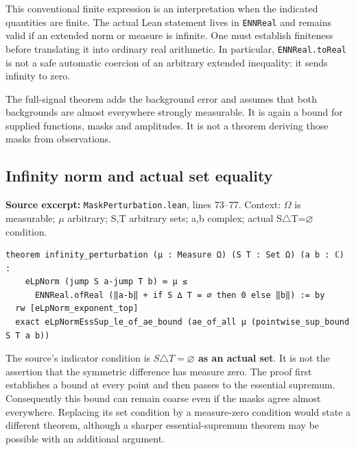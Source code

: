 \documentclass[11pt]{article}
\begin{document}
This conventional finite expression is an interpretation when the indicated quantities are finite. The actual Lean statement lives in \texttt{ENNReal} and remains valid if an extended norm or measure is infinite. One must establish finiteness before translating it into ordinary real arithmetic. In particular, \texttt{ENNReal.toReal} is not a safe automatic coercion of an arbitrary extended inequality: it sends infinity to zero.

The full-signal theorem adds the background error and assumes that both backgrounds are almost everywhere strongly measurable. It is again a bound for supplied functions, masks and amplitudes. It is not a theorem deriving those masks from observations.

\hypertarget{infinity-norm-and-actual-set-equality}{%
\subsection{Infinity norm and actual set equality}\label{infinity-norm-and-actual-set-equality}}

\textbf{Source excerpt:} \texttt{MaskPerturbation.lean}, lines 73--77. Context: \ensuremath{\Omega} is measurable; \ensuremath{\mu} arbitrary; S,T arbitrary sets; a,b complex; actual S\ensuremath{\triangle}T=\ensuremath{\varnothing} condition.

\begin{minipage}{\linewidth}
\begin{lstlisting}
theorem infinity_perturbation (μ : Measure Ω) (S T : Set Ω) (a b : ℂ) :
    eLpNorm (jump S a-jump T b) ∞ μ ≤
      ENNReal.ofReal (‖a-b‖ + if S ∆ T = ∅ then 0 else ‖b‖) := by
  rw [eLpNorm_exponent_top]
  exact eLpNormEssSup_le_of_ae_bound (ae_of_all μ (pointwise_sup_bound S T a b))
\end{lstlisting}
\end{minipage}\par

The source's indicator condition is \textbf{\(S\triangle T=\varnothing\) as an actual set}. It is not the assertion that the symmetric difference has measure zero. The proof first establishes a bound at every point and then passes to the essential supremum. Consequently this bound can remain coarse even if the masks agree almost everywhere. Replacing its set condition by a measure-zero condition would state a different theorem, although a sharper essential-supremum theorem may be possible with an additional argument.
\end{document}
